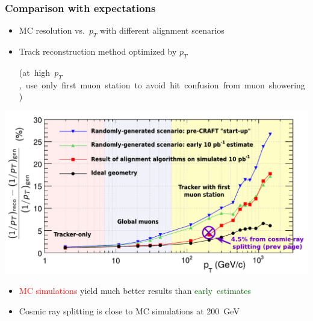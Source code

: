 \documentclass[compress]{beamer}
\begin{document}
\begin{frame}
\frametitle{Comparison with expectations}

\begin{itemize}
\item MC resolution vs.~$p_T$ with different alignment scenarios
\item Track reconstruction method optimized by $p_T$

\mbox{\scriptsize (at high $p_T$, use only first muon station to avoid hit confusion from muon showering)\hspace{-1 cm}}
\end{itemize}

\vspace{-0.15 cm}
\begin{center}
\includegraphics[width=0.9\linewidth]{curvature_resolution_cosmicpoint.pdf}
\end{center}

\vspace{-0.35 cm}
\begin{itemize}
\item \textcolor{red}{MC simulations} yield much better results than \mbox{\textcolor{darkgreen}{early estimates}\hspace{-1 cm}}
\item Cosmic ray splitting is close to MC simulations at 200~GeV
\end{itemize}
\end{frame}

\end{document}
